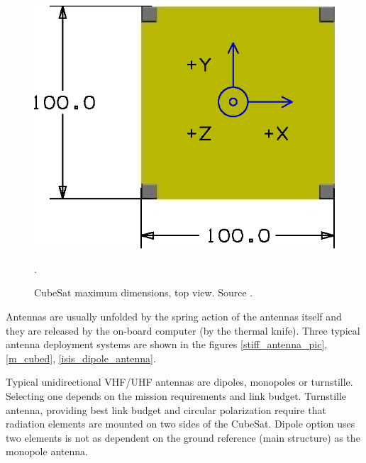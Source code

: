 \begin{figure}[H]
    \centering
    \includegraphics[width=0.5\paperwidth]{img/1/cubesat_dimensions.eps}
    \caption{CubeSat maximum dimensions, top view. Source \cite{cubesat_spec}.}.
    \label{CubeSat_max_dim}
\end{figure}

Antennas are usually unfolded by the spring action of the antennas itself and they are released by the on-board computer (by the thermal knife). Three typical antenna deployment systems are shown in the figures \ref{stiff_antenna_pic}, \ref{m_cubed}, \ref{isis_dipole_antenna}.

Typical unidirectional VHF/UHF antennas are dipoles, monopoles or turnstille. Selecting one depends on the mission requirements and link budget. Turnstille antenna, providing best link budget and circular polarization require that radiation elements are mounted on two sides of the CubeSat. Dipole option uses two elements is not as dependent on the ground reference (main structure) as the monopole antenna.

